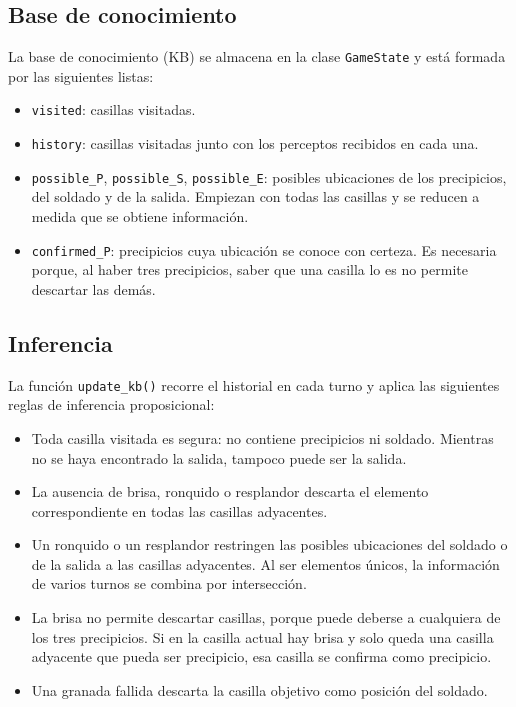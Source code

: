 \documentclass[11pt,a4paper]{article}
\newcommand{\code}[1]{\texttt{#1}}
\begin{document}
\subsection{Base de conocimiento}
La base de conocimiento (KB) se almacena en la clase \code{GameState} y está formada por las siguientes listas:
\begin{itemize}
\item \code{visited}: casillas visitadas.
\item \code{history}: casillas visitadas junto con los perceptos recibidos en cada una.
\item \code{possible\_P}, \code{possible\_S}, \code{possible\_E}: posibles ubicaciones de los precipicios, del soldado y de la salida. Empiezan con todas las casillas y se reducen a medida que se obtiene información.
\item \code{confirmed\_P}: precipicios cuya ubicación se conoce con certeza. Es necesaria porque, al haber tres precipicios, saber que una casilla lo es no permite descartar las demás.
\end{itemize}

\subsection{Inferencia}
La función \code{update\_kb()} recorre el historial en cada turno y aplica las siguientes reglas de inferencia proposicional:
\begin{itemize}
\item Toda casilla visitada es segura: no contiene precipicios ni soldado. Mientras no se haya encontrado la salida, tampoco puede ser la salida.
\item La ausencia de brisa, ronquido o resplandor descarta el elemento correspondiente en todas las casillas adyacentes.
\item Un ronquido o un resplandor restringen las posibles ubicaciones del soldado o de la salida a las casillas adyacentes. Al ser elementos únicos, la información de varios turnos se combina por intersección.
\item La brisa no permite descartar casillas, porque puede deberse a cualquiera de los tres precipicios. Si en la casilla actual hay brisa y solo queda una casilla adyacente que pueda ser precipicio, esa casilla se confirma como precipicio.
\item Una granada fallida descarta la casilla objetivo como posición del soldado.
\end{itemize}
\end{document}
